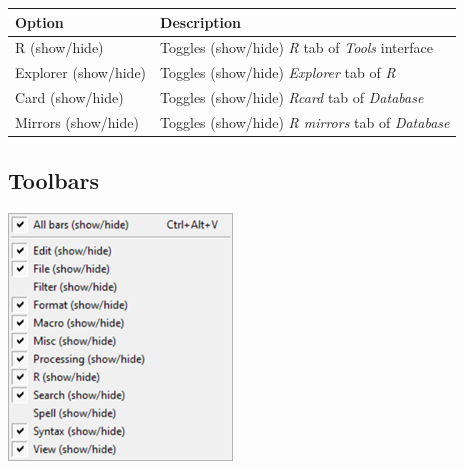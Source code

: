 \begin{scriptsize}
  \begin{tabularx}{\textwidth}{>{\hsize=0.3\hsize}X>{\hsize=0.7\hsize}X}\\
    \hline
    \textbf{Option} & \textbf{Description} \\
    \hline
    R (show/hide) & Toggles (show/hide) \textit{R} tab of \textit{Tools} interface \\
    \hdashline[1pt/1pt]
    Explorer (show/hide) & Toggles (show/hide) \textit{Explorer} tab of \textit{R} \\
    Card (show/hide) & Toggles (show/hide) \textit{Rcard} tab of \textit{Database} \\
    Mirrors (show/hide) & Toggles (show/hide) \textit{R mirrors} tab of \textit{Database} \\
    \hline
  \end{tabularx}
\end{scriptsize}


\hypertarget{menu_view_toolbars}{}
\subsection{Toolbars}

\includegraphics[scale=0.50]{./res/menu_view_toolsbar.png}\\

